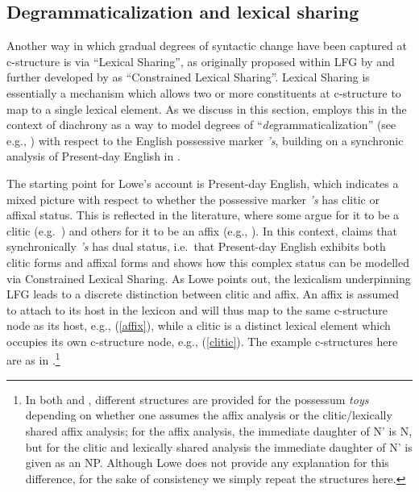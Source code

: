 \documentclass[output=paper,hidelinks]{langscibook}
\begin{document}
\newpage
\subsection{Degrammaticalization and lexical sharing}
\label{sec:Historical:lex-share}
\largerpage
Another way in which gradual degrees of syntactic change have been captured at c-structure is via ``Lexical Sharing'', as originally proposed within LFG by \citet{wescoat2002,wescoat2005,wescoat2007,wescoat2009} and further developed by \citet{Lowe15,lowe2015clitic} as ``Constrained Lexical Sharing''. Lexical Sharing is essentially a mechanism which allows two or more constituents at c-structure to map to a single lexical element.  As we discuss in this section, \citet{Lowe15} employs this in the context of diachrony as a way to model degrees of ``\textit{de}grammaticalization'' (see e.g., \citealp{norde2009degrammaticalization, willis_2017}) with respect to the English possessive marker \textit{'s}, building on a synchronic analysis of Present-day English in \citet{lowe2015clitic}. 

The starting point for Lowe's account is Present-day English, which indicates a mixed picture with respect to whether the possessive marker  \textit{'s} has clitic or affixal status. This is reflected in the literature, where some argue for it to be a clitic (e.g.~\citealp{quirk1985comprehensive,anderson2008english}) and others for it to be an affix  (e.g., \citealp{Zwicky87,payne2009english}). %
In this context, \citet{lowe2015clitic} claims that synchronically \textit{'s} has dual status, i.e.~that Present-day English exhibits both clitic forms and affixal forms and shows how this complex status can be modelled via Constrained Lexical Sharing. As Lowe points out, the lexicalism underpinning LFG leads to a discrete distinction between clitic and affix. An affix is assumed to attach to its host in the lexicon and will thus  map to the same c-structure node as its host,  e.g., (\ref{affix}),  while a clitic is a distinct lexical element which occupies its own c-structure node, e.g., (\ref{clitic}). The example c-structures here are  as  in \citet[213]{Lowe15}.\footnote{In both \citet[213]{Lowe15} and \citet[174]{lowe2015clitic}, different structures are provided for the possessum \textit{toys} depending on whether one assumes the affix analysis or the clitic/lexically shared affix analysis; for the affix analysis, the immediate daughter of N' is N, but for the clitic and lexically shared analysis the immediate daughter of N' is given as an NP. Although Lowe does not provide any explanation for this difference, for the sake of consistency we simply repeat the structures here.} %
\end{document}
